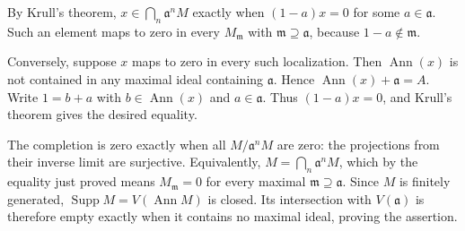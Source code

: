 By Krull's theorem, $x\in\bigcap_n\mathfrak{a}^nM$ exactly when $(1-a)x=0$ for some $a\in\mathfrak{a}$. Such an element maps to zero in every $M_{\mathfrak{m}}$ with $\mathfrak{m}\supseteq\mathfrak{a}$, because $1-a\notin\mathfrak{m}$.

Conversely, suppose $x$ maps to zero in every such localization. Then $\operatorname{Ann}(x)$ is not contained in any maximal ideal containing $\mathfrak{a}$. Hence $\operatorname{Ann}(x)+\mathfrak{a}=A$. Write $1=b+a$ with $b\in\operatorname{Ann}(x)$ and $a\in\mathfrak{a}$. Thus $(1-a)x=0$, and Krull's theorem gives the desired equality.

The completion is zero exactly when all $M/\mathfrak{a}^nM$ are zero: the projections from their inverse limit are surjective. Equivalently, $M=\bigcap_n\mathfrak{a}^nM$, which by the equality just proved means $M_{\mathfrak{m}}=0$ for every maximal $\mathfrak{m}\supseteq\mathfrak{a}$. Since $M$ is finitely generated, $\operatorname{Supp}M=V(\operatorname{Ann}M)$ is closed. Its intersection with $V(\mathfrak{a})$ is therefore empty exactly when it contains no maximal ideal, proving the assertion.
